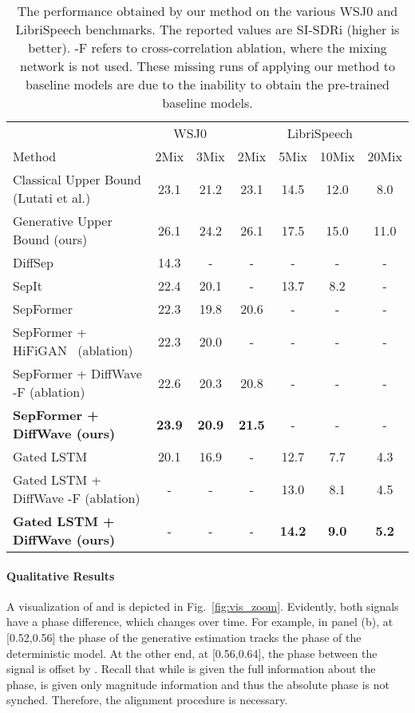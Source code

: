 \documentclass{article}
\theoremstyle{plain}
\theoremstyle{definition}
\theoremstyle{remark}
\begin{document}
\begin{table*}[t]
\caption{The performance obtained by our method on the various WSJ0 and LibriSpeech benchmarks. The reported values are SI-SDRi  (higher is better).  -F refers to cross-correlation ablation, where the mixing network  is not used. These missing runs of applying our method to baseline models are due to the inability to obtain the pre-trained baseline models.}
\label{tab:result_wsj0}
\label{tab:result_25spkrs}
\label{tab:result_1020spkrs}
\begin{center}
 \begin{tabular}{lcccccc} 
 \toprule
& \multicolumn{2}{c}{WSJ0} & \multicolumn{4}{c}{LibriSpeech}\\
 \cmidrule(lr){2-3}
 \cmidrule(lr){4-7}Method&  2Mix &  3Mix & 2Mix &  5Mix &10Mix &  20Mix \\
\midrule
Classical Upper Bound (Lutati et al.) &23.1 & 21.2 & 23.1 & 14.5 & 12.0 & 8.0\\
Generative Upper Bound (ours)&26.1 &24.2& 26.1 & 17.5 & 15.0 & 11.0\\
\midrule
DiffSep~\cite{scheibler2022diffusion}& 14.3&-&-&-&-&-\\
SepIt~\cite{sepit} & 22.4 & 20.1 &- & 13.7 & 8.2 & -\\
\midrule
SepFormer~\cite{subakan2021attention} & 22.3 & 19.8 & 20.6& -&- &-\\
SepFormer + HiFiGAN~\cite{kong2020hifi} (ablation)& 22.3 & 20.0 & - & -& -&-\\
SepFormer + DiffWave -F (ablation) & 22.6 & 20.3 & 20.8 & -& -&-\\
\textbf{SepFormer + DiffWave (ours)} & \textbf{23.9} & \textbf{20.9} & \textbf{21.5} &- &- &-\\
\midrule
Gated LSTM~\cite{pmlr-v119-nachmani20a} & 20.1&16.9 & - & 12.7 &7.7 & 4.3\\
Gated LSTM + DiffWave -F (ablation) &-&-&- &13.0 & 8.1 & 4.5\\
\textbf{Gated LSTM + DiffWave  (ours)} &- &- &-& \textbf{14.2} & \textbf{9.0} & \textbf{5.2}\\
 \bottomrule
\end{tabular}
\end{center}
\end{table*}

\paragraph{Qualitative Results}
A visualization of  and  is depicted in Fig.~\ref{fig:vis_zoom}. Evidently, both signals have a phase difference, which changes over time. For example, in panel (b), at [0.52,0.56] the phase of the generative estimation tracks the phase of the deterministic model. At the other end, at [0.56,0.64], the phase between the signal is offset by . Recall that while  is given the full information about the phase,  is given only magnitude information and thus the absolute phase is not synched. Therefore, the alignment procedure is necessary.
\end{document}

